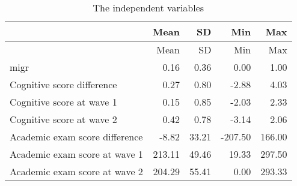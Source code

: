 \documentclass[
  man,floatsintext]{apa7}
\begin{document}
\begin{longtable}[]{@{}lrrrr@{}}
\caption{The independent variables}\tabularnewline
\toprule
& Mean & SD & Min & Max \\
\midrule
\endfirsthead
\toprule
& Mean & SD & Min & Max \\
\midrule
\endhead
migr & 0.16 & 0.36 & 0.00 & 1.00 \\
Cognitive score difference & 0.27 & 0.80 & -2.88 & 4.03 \\
Cognitive score at wave 1 & 0.15 & 0.85 & -2.03 & 2.33 \\
Cognitive score at wave 2 & 0.42 & 0.78 & -3.14 & 2.06 \\
Academic exam score difference & -8.82 & 33.21 & -207.50 & 166.00 \\
Academic exam score at wave 1 & 213.11 & 49.46 & 19.33 & 297.50 \\
Academic exam score at wave 2 & 204.29 & 55.41 & 0.00 & 293.33 \\
\bottomrule
\end{longtable}
\end{document}
